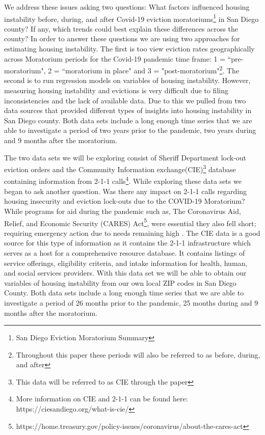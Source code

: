 \documentclass[man, 12pt, donotrepeattitle, floatsintext]{apa7} %
\begin{document}
We address these issues asking two questions: What factors influenced housing instability before, during, and after Covid-19 eviction moratoriums\footnote{San Diego Eviction Moratorium Summary} in San Diego county? If any, which trends could best explain these differences across the county? In order to answer these questions we are using two approaches for estimating housing instability. The first is too view eviction rates geographically across Moratorium periods for the Covid-19 pandemic time frame: 1 = “pre-moratorium", 2 = “moratorium in place" and 3 = "post-moratorium"\footnote{Throughout this paper these periods will also be referred to as before, during, and after}. The second is to run regression models on variables of housing instability. However, measuring housing instability and evictions is very difficult due to filing inconsistencies and the lack of available data. Due to this we pulled from two data sources that provided different types of insights into housing instability in San Diego county. Both data sets include a long enough time series that we are able to investigate a period of two years prior to the pandemic, two years during and 9 months after the moratorium.

The two data sets we will be exploring consist of Sheriff Department lock-out eviction orders and the Community Information exchange(CIE)\footnote{This data will be referred to as CIE through the paper} database containing information from 2-1-1 calls\footnote{More information on CIE and 2-1-1 can be found here: https://ciesandiego.org/what-is-cie/}. While exploring these data sets we began to ask another question. Was there any impact on 2-1-1 calls regarding housing insecurity and eviction lock-outs due to the COVID-19 Moratorium? While programs for aid during the pandemic such as, The Coronavirus Aid, Relief, and Economic Security (CARES) Act\footnote{https://home.treasury.gov/policy-issues/coronavirus/about-the-cares-act}, were essential they also fell short; requiring emergency action due to needs remaining high \parencite{Lake2022}. The CIE data is a good source for this type of information as it contains the 2-1-1 infrastructure which serves as a host for a comprehensive resource database. It contains listings of service offerings, eligibility criteria, and intake information for health, human, and social services providers. With this data set we will be able to obtain our variables of housing instability from our own local ZIP codes in San Diego County. Both data sets include a long enough time series that we are able to investigate a period of 26 months prior to the pandemic, 25 months during and 9 months after the moratorium.
\end{document}
